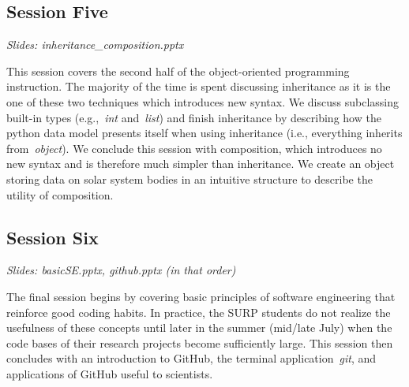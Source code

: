 \subsection{Session Five}
\label{sec:curriculum:five}
\noindent
\textit{Slides: inheritance\_composition.pptx}
\par\noindent
This session covers the second half of the object-oriented programming
instruction.
The majority of the time is spent discussing inheritance as it is the one of
these two techniques which introduces new syntax.
We discuss subclassing built-in types (e.g.,~\textit{int} and~\textit{list})
and finish inheritance by describing how the python data model presents itself
when using inheritance (i.e., everything inherits from~\textit{object}).
We conclude this session with composition, which introduces no new syntax and
is therefore much simpler than inheritance.
We create an object storing data on solar system bodies in an intuitive
structure to describe the utility of composition.

\subsection{Session Six}
\label{sec:curriculum:six}
\noindent
\textit{Slides: basicSE.pptx, github.pptx (in that order)}
\par\noindent
The final session begins by covering basic principles of software engineering
that reinforce good coding habits.
In practice, the SURP students do not realize the usefulness of these concepts
until later in the summer (mid/late July) when the code bases of their research
projects become sufficiently large.
This session then concludes with an introduction to GitHub, the terminal
application~\textit{git}, and applications of GitHub useful to scientists.

